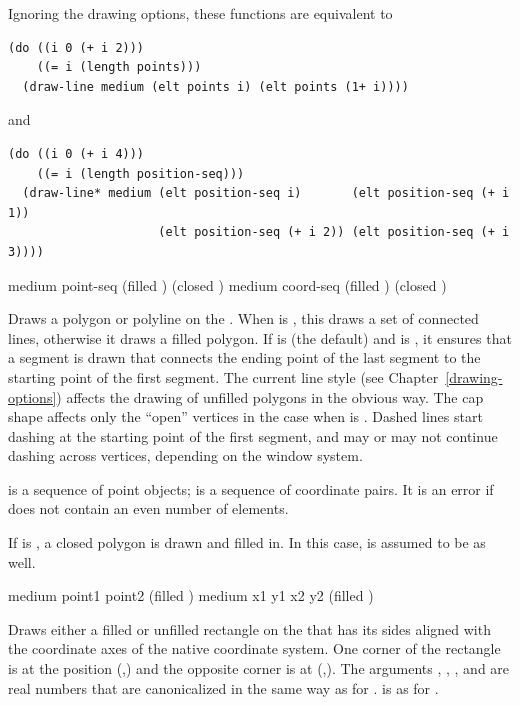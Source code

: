 Ignoring the drawing options, these functions are equivalent to
\begin{verbatim}
(do ((i 0 (+ i 2)))
    ((= i (length points)))
  (draw-line medium (elt points i) (elt points (1+ i))))
\end{verbatim}
and
\begin{verbatim}
(do ((i 0 (+ i 4)))
    ((= i (length position-seq)))
  (draw-line* medium (elt position-seq i)       (elt position-seq (+ i 1))
                     (elt position-seq (+ i 2)) (elt position-seq (+ i 3))))
\end{verbatim}


  {medium point-seq \key (filled ) (closed )
                        \DrawingOptions  \LineJointCapOptions}
 {medium coord-seq \key (filled ) (closed ) 
                        \DrawingOptions \LineJointCapOptions}

Draws a polygon or polyline on the  .  When
 is , this draws a set of connected lines, otherwise it
draws a filled polygon.  If  is  (the default) and
 is , it ensures that a segment is drawn that connects
the ending point of the last segment to the starting point of the first segment.
The current line style (see Chapter~\ref{drawing-options}) affects the drawing
of unfilled polygons in the obvious way.  The cap shape affects only the
``open'' vertices in the case when  is .  Dashed lines
start dashing at the starting point of the first segment, and may or may not
continue dashing across vertices, depending on the window system.

 is a sequence of point objects;  is a sequence of
coordinate pairs.  It is an error if  does not contain an even
number of elements.

If  is , a closed polygon is drawn and filled in.  In
this case,  is assumed to be  as well.


 {medium point1 point2 \key (filled )
                         \DrawingOptions \LineJointOptions}
 {medium x1 y1 x2 y2 \key (filled )
                          \DrawingOptions \LineJointOptions} 

Draws either a filled or unfilled rectangle on the   that
has its sides aligned with the coordinate axes of the native coordinate system.
One corner of the rectangle is at the position (,) and the
opposite corner is at (,).  The arguments , ,
, and  are real numbers that are canonicalized in the same way
as for .   is as for .

